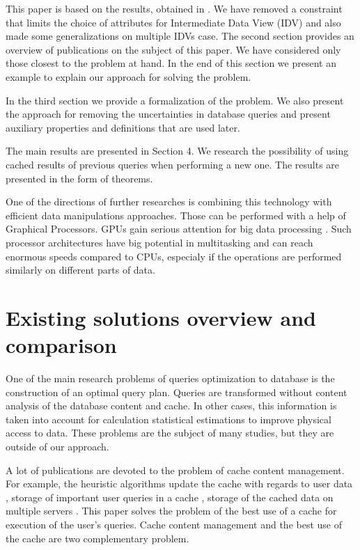 \documentclass{article}
\begin{document}
This paper is based on the results, obtained in \cite{zyk_pol}. We have removed
a constraint that limits the choice of attributes for Intermediate Data View
(IDV) and also made some generalizations on multiple IDVs case.
The second section provides an overview of publications on the subject of this
paper. We have considered only those closest to the problem at hand. In the end
of this section we present an example to explain our approach for solving the
problem.

In the third section we provide a formalization of the problem. We also present
the approach for removing the uncertainties in database queries and present
auxiliary properties and definitions that are used later.

The main results are presented in Section 4. We research the possibility of
using cached results of previous queries when performing a new one. The results
are presented in the form of theorems.

One of the directions of further researches is combining this technology with efficient data manipulations approaches. Those can be performed with a help of Graphical Processors. GPUs gain serious attention for big data processing \cite{owens, bakkum, govin, yang}. Such processor architectures have big potential in multitasking and can reach enormous speeds compared to CPUs, especialy if the operations are performed similarly on different parts of data.
 
\section{Existing solutions overview and comparison}
One of the main research problems of queries optimization to database is the
construction of an optimal query plan. Queries are transformed without content
analysis of the database content and cache. In other cases, this information is
taken into account for calculation statistical estimations to improve physical
access to data. These problems are the subject of many studies, but they are
outside of our approach.

A lot of publications are devoted to the problem of cache content management.
For example, the heuristic algorithms update the cache with regards to user data
\cite{chang}, storage of important user queries in a cache
\cite{baralis}, storage of the cached data on multiple servers \cite{kalnis}.
This paper solves the problem of the best use of a cache for execution of the
user's queries. Cache content management and the best use of the cache are two
complementary problem.
\end{document}
